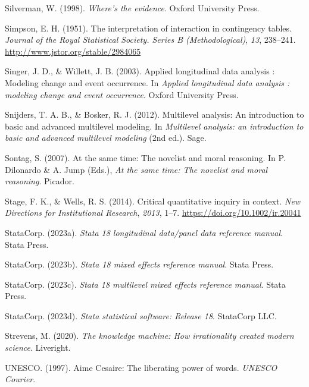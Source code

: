 \documentclass[
  letterpaper,
  DIV=11,
  numbers=noendperiod]{scrreprt}
\newlength{\cslhangindent}
\newenvironment{CSLReferences}[2] %
 {\begin{list}{}{%
  \setlength{\itemindent}{0pt}
  \setlength{\leftmargin}{0pt}
  \setlength{\parsep}{0pt}
  \ifodd #1
   \setlength{\leftmargin}{\cslhangindent}
   \setlength{\itemindent}{-1\cslhangindent}
  \fi
  \setlength{\itemsep}{#2\baselineskip}}}
 {\end{list}}
\begin{document}
\begin{CSLReferences}{1}{0}
Silverman, W. (1998). \emph{Where's the evidence}. Oxford University
Press.

Simpson, E. H. (1951). The interpretation of interaction in contingency
tables. \emph{Journal of the Royal Statistical Society. Series B
(Methodological)}, \emph{13}, 238--241.
\url{http://www.jstor.org/stable/2984065}

Singer, J. D., \& Willett, J. B. (2003). Applied longitudinal data
analysis : Modeling change and event occurrence. In \emph{Applied
longitudinal data analysis : modeling change and event occurrence}.
Oxford University Press.

Snijders, T. A. B., \& Bosker, R. J. (2012). Multilevel analysis: An
introduction to basic and advanced multilevel modeling. In
\emph{Multilevel analysis: an introduction to basic and advanced
multilevel modeling} (2nd ed.). Sage.

Sontag, S. (2007). At the same time: The novelist and moral reasoning.
In P. Dilonardo \& A. Jump (Eds.), \emph{At the same time: The novelist
and moral reasoning}. Picador.

Stage, F. K., \& Wells, R. S. (2014). Critical quantitative inquiry in
context. \emph{New Directions for Institutional Research}, \emph{2013},
1--7. \url{https://doi.org/10.1002/ir.20041}

StataCorp. (2023a). \emph{Stata 18 longitudinal data/panel data
reference manual}. Stata Press.

StataCorp. (2023b). \emph{Stata 18 mixed effects reference manual}.
Stata Press.

StataCorp. (2023c). \emph{Stata 18 multilevel mixed effects reference
manual}. Stata Press.

StataCorp. (2023d). \emph{Stata statistical software: Release 18}.
StataCorp LLC.

Strevens, M. (2020). \emph{The knowledge machine: How irrationality
created modern science}. Liveright.

UNESCO. (1997). {A}ime {C}esaire: The liberating power of words.
\emph{UNESCO Courier}.


\end{CSLReferences}
\end{document}
